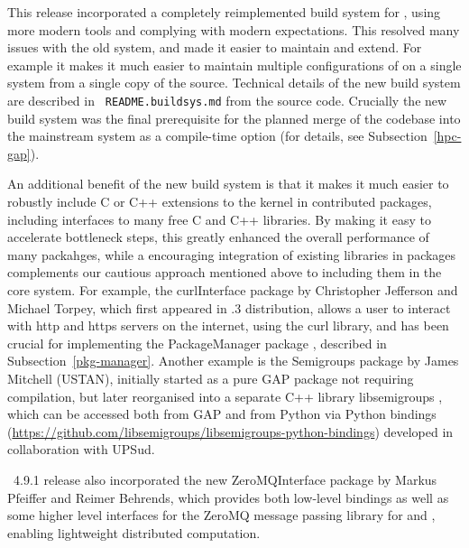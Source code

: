 \documentclass{deliverablereport}
\begin{document}
This release incorporated a completely
reimplemented build system for \GAP, using more modern tools and
complying with modern expectations. This resolved many issues with the
old system, and made it easier to maintain and extend. For example it
makes it much easier to maintain multiple configurations of \GAP on a
single system from a single copy of the source. Technical
details of the new build system are described in {\tt
  README.buildsys.md} from the \GAP source code. Crucially the new build system
was the final prerequisite for the planned  merge of the \HPCGAP codebase  into the
mainstream \GAP system as a compile-time option (for details, see
Subsection~\ref{hpc-gap}).

An additional benefit of the new build system is that it makes it much
easier to robustly include C or C++ extensions to the \GAP kernel in
contributed packages, including interfaces to many free C and C++
libraries. By making it easy to accelerate bottleneck steps, this
greatly enhanced the overall performance of many packahges, while a
encouraging integration of existing libraries in packages complements
our cautious approach mentioned above to including them in the core
system. 
For example, the {\sf curlInterface} package \cite{curlInterface}
by Christopher Jefferson and Michael Torpey, which first appeared
in .3 distribution, allows a user to interact 
with http and https servers on the internet, using the {\sf curl} library, 
and has been crucial for implementing the {\sf PackageManager} package
\cite{PackageManager}, described in Subsection~\ref{pkg-manager}.
Another example is the {\sf Semigroups} package \cite{Semigroups} 
by James Mitchell (USTAN), initially started as a pure GAP
package not requiring compilation, but later reorganised into a
separate C++ library libsemigroups , which can be
accessed both from GAP and from Python via Python bindings
(\url{https://github.com/libsemigroups/libsemigroups-python-bindings})
developed in collaboration with UPSud. 

\GAP~4.9.1 release also incorporated the new {\sf ZeroMQInterface} package \cite{ZeroMQInterface} by Markus Pfeiffer and Reimer Behrends, which
provides both low-level bindings as well as some higher level interfaces
for the {\sf ZeroMQ} message passing library for \GAP and \HPCGAP, 
enabling lightweight distributed computation. 
\end{document}
